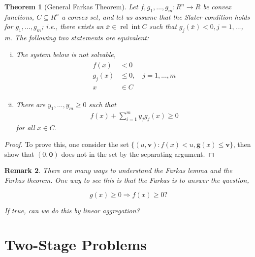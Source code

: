 \documentclass{beamerswitch}
\newtheorem{thm}{Theorem}[section]
\newtheorem{remark}[thm]{Remark}
\begin{document}
\begin{thm}[General Farkas Theorem]
    Let $f, g_{1}, \ldots, g_{m}: R ^{n} \rightarrow R$ be convex functions, $C \subseteq R ^{n}$ a convex set, and let us assume that the Slater condition holds for $g_{1}, \ldots, g_{m}$; i.e., there exists an $\bar{x} \in \operatorname{rel} \operatorname{int} C$ such that $g_{j}(\bar{x})<0, j=1, \ldots$, m. The following two statements are equivalent:
    \begin{enumerate}[(i)]
        \item  The system below is not solvable,
              \begin{align*}
                  \begin{aligned}
                      f(x)     & <0                           \\
                      g_{j}(x) & \leq 0, \quad j=1, \ldots, m \\
                      x        & \in C
                  \end{aligned}
              \end{align*}
        \item  There are $y_{1}, \ldots, y_{m} \geq 0$ such that
              \begin{align*}
                  f(x)+\sum_{i=1}^{m} y_{j} g_{j}(x) \geq 0
              \end{align*}
              for all $x \in C$.
    \end{enumerate}
\end{thm}
\begin{proof}
    To prove this, one consider the set \(\{(u, \bm v): f(x) < u, \bm g(x) \le \bm v\}\), then show that \((0, \bm 0)\) does not in the set by the separating argument.
\end{proof}

\begin{remark}
    There are many ways to understand the Farkas lemma and the Farkas theorem. One way to see this is that the Farkas is to answer the question,

    \[g(x) \ge 0 \Rightarrow f(x) \ge 0?\]

    If true, can we do this by linear aggregation?
\end{remark}

\section{Two-Stage Problems}
\end{document}
